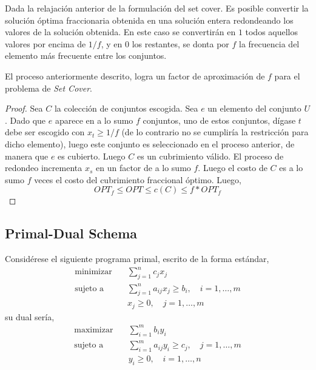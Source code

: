 \documentclass[../np-approximations.tex]{subfiles}
\begin{document}
Dada la relajación anterior de la formulación del set cover. Es posible convertir la solución óptima fraccionaria obtenida en una solución entera redondeando los valores de la solución obtenida. En este caso se convertirán en $1$ todos aquellos valores por encima de $1/f$, y en $0$ los restantes, se donta por $f$ la frecuencia del elemento más frecuente entre los conjuntos.

\begin{theorem}
	El proceso anteriormente descrito, logra un factor de aproximación de $f$ para el problema de \emph{Set Cover}.
\end{theorem}

\begin{proof}
	Sea $C$ la colección de conjuntos escogida. Sea $e$ un elemento del conjunto $U$. Dado que $e$ aparece en a lo sumo $f$ conjuntos, uno de estos conjuntos, dígase $t$ debe ser escogido con $x_t\ge 1/f$ (de lo contrario no se cumpliría la restricción para dicho elemento), luego este conjunto es seleccionado en el proceso anterior, de manera que $e$ es cubierto. Luego $C$ es un cubrimiento válido. El proceso de redondeo incrementa $x_s$ en un factor de a lo sumo $f$. Luego el costo de $C$ es a lo sumo $f$ veces el costo del cubrimiento fraccional óptimo. Luego,
	\begin{equation*}
		OPT_f \le OPT \le c(C) \le f*OPT_f
	\end{equation*}
												
\end{proof}

\subsection{Primal-Dual Schema}

Considérese el siguiente programa primal, escrito de la forma estándar,
\begin{equation*}
	\begin{split}
		\text{minimizar}\quad & \sum_{j=1}^n c_j x_j \\
		\text{sujeto a}\quad  & \sum_{j=1}^n a_{ij}x_j \ge b_i, \quad i=1,\dots,m \\
		& x_j \ge 0,\quad j=1,\dots,m 
	\end{split}
\end{equation*}
su dual sería,
\begin{equation*}
	\begin{split}
		\text{maximizar}\quad & \sum_{i=1}^m b_i y_i \\
		\text{sujeto a}\quad  & \sum_{i=1}^m a_{ij}y_i \ge c_j, \quad j=1,\dots,m \\
		& y_i \ge 0,\quad i=1,\dots,n
	\end{split}
\end{equation*}
\end{document}
